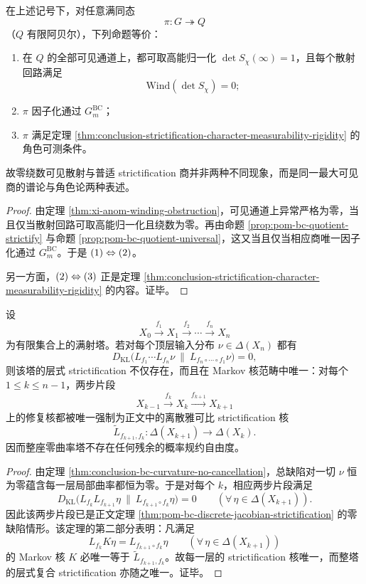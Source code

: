 \begin{corollary}[零绕数可见散射商的精确刻画]\label{cor:conclusion-zero-winding-visible-scattering-exact-strictification}
在上述记号下，对任意满同态
\[
\pi:G\twoheadrightarrow Q
\]
（\(Q\) 有限阿贝尔），下列命题等价：
\begin{enumerate}
  \item 在 \(Q\) 的全部可见通道上，都可取高能归一化 \(\det S_\chi(\infty)=1\)，且每个散射回路满足
  \[
  \mathrm{Wind}(\det S_\chi)=0;
  \]
  \item \(\pi\) 因子化通过 \(G_m^{\mathrm{BC}}\)；
  \item \(\pi\) 满足定理 \ref{thm:conclusion-strictification-character-measurability-rigidity} 的角色可测条件。
\end{enumerate}
故零绕数可见散射与普适 strictification 商并非两种不同现象，而是同一最大可见商的谱论与角色论两种表述。
\end{corollary}
\begin{proof}
由定理 \ref{thm:xi-anom-winding-obstruction}，可见通道上异常严格为零，当且仅当散射回路可取高能归一化且绕数为零。再由命题 \ref{prop:pom-bc-quotient-strictify} 与命题 \ref{prop:pom-bc-quotient-universal}，这又当且仅当相应商唯一因子化通过 \(G_m^{\mathrm{BC}}\)。于是 \(\textup{(1)}\Leftrightarrow\textup{(2)}\)。

另一方面，\(\textup{(2)}\Leftrightarrow\textup{(3)}\) 正是定理 \ref{thm:conclusion-strictification-character-measurability-rigidity} 的内容。证毕。
\end{proof}

\begin{theorem}\label{thm:conclusion-zero-curvature-tower-canonical-strictification-uniqueness}
设
\[
X_0\xrightarrow{f_1}X_1\xrightarrow{f_2}\cdots\xrightarrow{f_n}X_n
\]
为有限集合上的满射塔。若对每个顶层输入分布 \(\nu\in\Delta(X_n)\) 都有
\[
D_{\mathrm{KL}}\!\bigl(L_{f_1}\cdots L_{f_n}\nu\ \|\ L_{f_n\circ\cdots\circ f_1}\nu\bigr)=0,
\]
则该塔的层式 strictification 不仅存在，而且在 Markov 核范畴中唯一：对每个 \(1\le k\le n-1\)，两步片段
\[
X_{k-1}\xrightarrow{f_k}X_k\xrightarrow{f_{k+1}}X_{k+1}
\]
上的修复核都被唯一强制为正文中的离散雅可比 strictification 核
\[
\widetilde L_{f_{k+1},f_k}:\Delta(X_{k+1})\to\Delta(X_k).
\]
因而整座零曲率塔不存在任何残余的概率规约自由度。
\end{theorem}
\begin{proof}
由定理 \ref{thm:conclusion-bc-curvature-no-cancellation}，总缺陷对一切 \(\nu\) 恒为零蕴含每一层局部曲率都恒为零。于是对每个 \(k\)，相应两步片段满足
\[
D_{\mathrm{KL}}\!\bigl(L_{f_k}L_{f_{k+1}}\eta\ \|\ L_{f_{k+1}\circ f_k}\eta\bigr)=0
\qquad(\forall\,\eta\in\Delta(X_{k+1})).
\]
因此该两步片段已是正文定理 \ref{thm:pom-bc-discrete-jacobian-strictification} 的零缺陷情形。该定理的第二部分表明：凡满足
\[
L_{f_k}K\eta=L_{f_{k+1}\circ f_k}\eta
\qquad(\forall\,\eta\in\Delta(X_{k+1}))
\]
的 Markov 核 \(K\) 必唯一等于 \(\widetilde L_{f_{k+1},f_k}\)。故每一层的 strictification 核唯一，而整塔的层式复合 strictification 亦随之唯一。证毕。
\end{proof}

